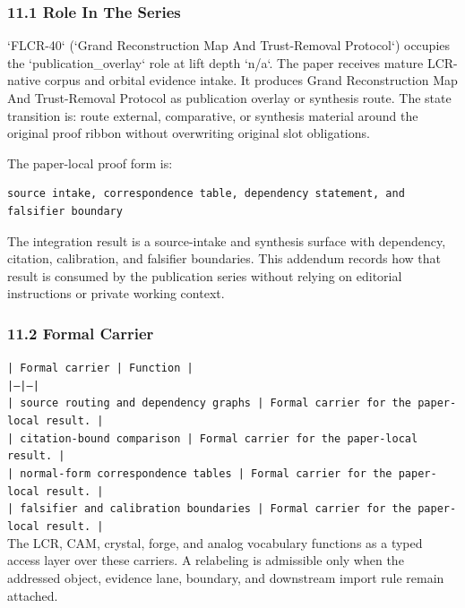 \documentclass[11pt]{article}
\begin{document}
\subsubsection*{11.1 Role In The Series}

`FLCR-40` (`Grand Reconstruction Map And Trust-Removal Protocol`) occupies the `publication\_overlay` role at lift depth `n/a`.
The paper receives mature LCR-native corpus and orbital evidence intake. It produces Grand Reconstruction Map And Trust-Removal Protocol as publication overlay or synthesis route. The state transition is:
route external, comparative, or synthesis material around the original proof ribbon without overwriting original slot obligations.

The paper-local proof form is:

\begin{verbatim}
source intake, correspondence table, dependency statement, and falsifier boundary
\end{verbatim}

The integration result is a source-intake and synthesis surface with dependency, citation, calibration, and falsifier boundaries. This addendum records how that result is
consumed by the publication series without relying on editorial instructions or
private working context.

\subsubsection*{11.2 Formal Carrier}

\noindent\texttt{| Formal carrier | Function |}\\
\noindent\texttt{|---|---|}\\
\noindent\texttt{| source routing and dependency graphs | Formal carrier for the paper-local result. |}\\
\noindent\texttt{| citation-bound comparison | Formal carrier for the paper-local result. |}\\
\noindent\texttt{| normal-form correspondence tables | Formal carrier for the paper-local result. |}\\
\noindent\texttt{| falsifier and calibration boundaries | Formal carrier for the paper-local result. |}\\

The LCR, CAM, crystal, forge, and analog vocabulary functions as a typed access
layer over these carriers. A relabeling is admissible only when the addressed
object, evidence lane, boundary, and downstream import rule remain attached.
\end{document}
